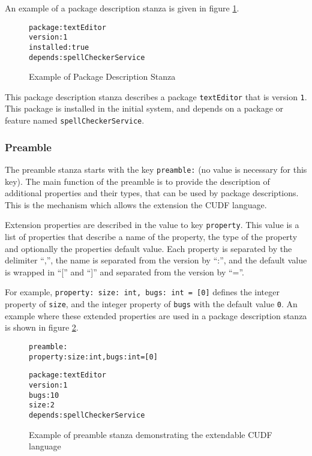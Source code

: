 An example of a package description stanza is given in figure \ref{formal.cudfpdstanza}.
\begin{figure}[htp] 
\begin{center}
\begin{alltt}
package: textEditor
version: 1
installed: true
depends: spellCheckerService
\end{alltt}
  \caption{Example of Package Description Stanza}
  \label{formal.cudfpdstanza}
\end{center}
\end{figure}
This package description stanza describes a package \texttt{textEditor} that is version \texttt{1}.
This package is installed in the initial system, and depends on a package or feature named \texttt{spellCheckerService}. 

\subsubsection{Preamble}
\label{cudf.preambledes}
The preamble stanza starts with the key \verb+preamble:+ (no value is necessary for this key).
The main function of the preamble is to provide the description of additional properties and their types, that can be used by package descriptions.
This is the mechanism which allows the extension the CUDF language.

Extension properties are described in the value to key \verb+property+.
This value is a list of properties that describe a name of the property, the type of the property and optionally the properties default value.
Each property is separated by the delimiter ``,'', the name is separated from the version by ``:'', and the default value is wrapped in ``['' and ``]'' and separated from the version by ``=''.

For example, \verb+property: size: int, bugs: int = [0]+ defines the integer property of \verb+size+, and the integer property of \verb+bugs+ with the default value \verb+0+.
An example where these extended properties are used in a package description stanza is shown in figure \ref{formal.cudfextensionexample}.

\begin{figure}[htp] 
\begin{center}
\begin{alltt}
preamble:
property: size: int, bugs: int = [0]

package: textEditor
version: 1
bugs: 10
size: 2
depends: spellCheckerService

\end{alltt}
  \caption{Example of preamble stanza demonstrating the extendable CUDF language}
  \label{formal.cudfextensionexample}
\end{center}
\end{figure}

